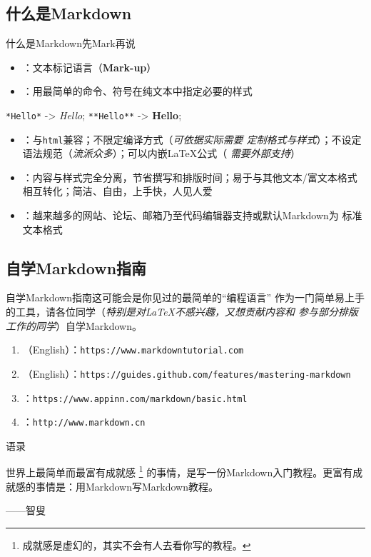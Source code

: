 \documentclass[10pt]{beamer}
\begin{document}
\subsection{什么是Markdown}
\begin{frame}{什么是Markdown}{先Mark再说}
\begin{itemize}
    \item {}：文本标记语言（\textbf{Mark-up}）
    \item {}：用最简单的命令、符号在纯文本中指定必要的样式
\end{itemize}

\begin{center}\color{XJTUdarkred}
\texttt{*Hello*} -> \textit{Hello}; \texttt{**Hello**} -> \textbf{Hello};
\end{center}

\begin{itemize}
    \item {}：与\texttt{html}兼容；不限定编译方式（\textit{可依据实际需要
    定制格式与样式}）；不设定语法规范（\textit{流派众多}）；可以内嵌\LaTeX{}公式（
    \textit{需要外部支持}）
    \item {}：内容与样式完全分离，节省撰写和排版时间；易于与其他文本/富文本格式
    相互转化；简洁、自由，上手快，人见人爱
    \item {}：越来越多的网站、论坛、邮箱乃至代码编辑器支持或默认Markdown为
    标准文本格式
\end{itemize}

\end{frame}

\subsection{自学Markdown指南}
\begin{frame}{自学Markdown指南}{这可能会是你见过的最简单的“编程语言”}
作为一门简单易上手的工具，请各位同学（\textit{特别是对\LaTeX{}不感兴趣，又想贡献内容和
参与部分排版工作的同学}）自学Markdown。
\begin{enumerate}
    \item {}（English）：\texttt{https://www.markdowntutorial.com}
    \item {}（English）：\texttt{https://guides.github.com/features/mastering-markdown}
    \item {}：\texttt{https://www.appinn.com/markdown/basic.html}
    \item {}：\texttt{http://www.markdown.cn}
\end{enumerate}

\begin{block}{语录}
{\kaishu
世界上最简单而最富有成就感
\footnote{成就感是虚幻的，其实不会有人去看你写的教程。}
的事情，是写一份Markdown入门教程。更富有成就感的事情是：用Markdown写Markdown教程。

\begin{flushright}
——智叟
\end{flushright}
}
\end{block}
\end{frame}
\end{document}
